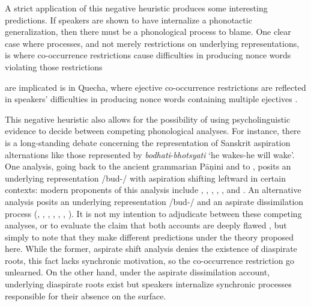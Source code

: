 A strict application of this negative heuristic produces some interesting predictions. If speakers are shown to have internalize a phonotactic generalization, then there must be a phonological process to blame. One clear case where processes, and not merely restrictions on underlying representations, 
is where co-occurrence restrictions cause difficulties in producing nonce words violating those restrictions
\citep{Rose2007,GallagherInPress}

are implicated is in Quecha, where ejective co-occurrence restrictions are reflected in speakers' difficulties in producing nonce words containing multiple ejectives \citep{GallagherInPress}. 

This negative heuristic also allows for the possibility of using psycholinguistic evidence to decide between competing phonological analyses. For instance, there is a long-standing debate concerning the representation of Sanskrit aspiration alternations like those represented by \emph{bodhati}-\emph{bhotsyati} `he wakes-he will wake'. One analysis, going back to the ancient grammarian Pāṇini \citep{Sag1974} and to \citet[\S141f.]{Whitney1889}, posits an underlying representation /bud\asp{}-/ with aspiration shifting leftward in certain contexts: modern proponents of this analysis include \citet{Borowsky1983}, \citet[][59f.]{Hoenigswald1965}, \citet{Kaye1985}, \citet{Sag1974,Sag1976} \citet{Schindler1976}, \citet{Stemberger1980}, and \citet[][\S141f.]{Whitney1889}. An alternative analysis posits an underlying representation /b\asp{}ud\asp{}-/ and an aspirate dissimilation process (\citealt{Anderson1970}, \citeyear[46f.]{Anderson1974}, \citealt{Hoard1975}, \citealt[\S3.2]{Kiparsky1965}, \citealt{Phelps1973}, \citealt{Phelps1975b}, \citealt[109f.]{Zwicky1965}). It is not my intention to adjudicate between these competing analyses, or to evaluate the claim that both accounts are deeply flawed \citep{Janda1989}, but simply to note that they make different predictions under the theory proposed here. While the former, aspirate shift analysis denies the existence of diaspirate roots, this fact lacks synchronic motivation, so the co-occurrence restriction go unlearned. On the other hand, under the aspirate dissimilation account, underlying diaspirate roots exist but speakers internalize synchronic processes responsible for their absence on the surface.

